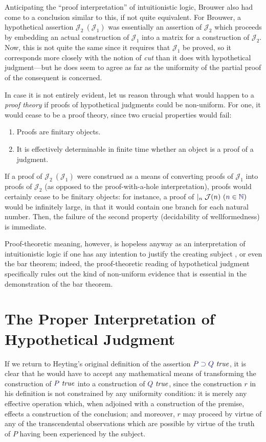 \documentclass[11pt]{amsart}
\theoremstyle{definition}
\theoremstyle{remark}
\numberwithin{equation}{section}
\def\InputModeColorName{MidnightBlue}
\newcommand\InputMode[1]{{\color{\InputModeColorName}{#1}}}
\newcommand\HypJ[2]{#1\ (#2)}
\newcommand\GenJ[2]{\vert_{#1}\; #2}
\newcommand\JJ{\mathcal{J}}
\newcommand\IsTrue[1]{\InputMode{#1}\ \mathit{true}}
\newcommand\Member[2]{\InputMode{#1}\in \InputMode{#2}}
\newcommand\Nat{\mathbb{N}}
\newcommand\Imp[2]{#1\supset #2}
\begin{document}
Anticipating the ``proof interpretation'' of intuitionistic logic, Brouwer also
had come to a conclusion similar to this, if not quite equivalent. For Brouwer,
a hypothetical assertion $\HypJ{\JJ_2}{\JJ_1}$ was essentially an assertion of
$\JJ_2$ which proceeds by embedding an actual construction of $\JJ_1$ into a
matrix for a construction of $\JJ_2$. Now, this is not quite the same since it
requires that $\JJ_1$ be proved, so it corresponds more closely with the notion
of \emph{cut} than it does with hypothetical judgment---but he does seem to
agree as far as the uniformity of the partial proof of the consequent is
concerned.

In case it is not entirely evident, let us reason through what would happen to a
\emph{proof theory} if proofs of hypothetical judgments could be non-uniform.
For one, it would cease to be a proof theory, since two crucial properties would
fail:

\begin{enumerate}
  \item Proofs are finitary objects.
  \item It is effectively determinable in finite time whether an object is
    a proof of a judgment.
\end{enumerate}

If a proof of $\HypJ{\JJ_2}{\JJ_1}$ were construed as a means of converting
proofs of $\JJ_1$ into proofs of $\JJ_2$ (as opposed to the proof-with-a-hole
interpretation), proofs would certainly cease to be finitary objects: for
instance, a proof of $\GenJ{n}{\HypJ{\JJ(n)}{\Member{n}{\Nat}}}$ would be
infinitely large, in that it would contain one branch for each natural number.
Then, the failure of the second property (decidability of wellformedness) is
immediate.

Proof-theoretic meaning, however, is hopeless anyway as an interpretation of
intuitionistic logic if one has any intention to justify the creating subject
\cite{mva:personal}, or even the bar theorem; indeed, the proof-theoretic
reading of hypothetical judgment specifically rules out the kind of non-uniform
evidence that is essential in the demonstration of the bar theorem.

\section{The Proper Interpretation of Hypothetical Judgment}

If we return to Heyting's original definition of the assertion
$\IsTrue{\Imp{P}{Q}}$, it is clear that he would have to accept any mathematical
means of transforming the construction of $\IsTrue{P}$ into a construction of
$\IsTrue{Q}$, since the construction $r$ in his definition is not constrained by
any uniformity condition: it is merely any effective operation which, when
adjoined with a construction of the premise, effects a construction of the
conclusion; and moreover, $r$ may proceed by virtue of any of the transcendental
observations which are possible by virtue of the truth of $P$ having been
experienced by the subject.
\end{document}
